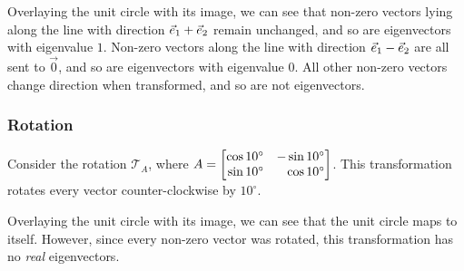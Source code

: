\begin{center}
\end{center}

Overlaying the unit circle with its image, we can see that non-zero vectors lying along the line with direction ${\vec e_1} + {\vec e_2}$ remain unchanged,
and so are eigenvectors
with eigenvalue $1$. Non-zero vectors along the line with direction ${\vec e_1} - {\vec e_2}$ are all sent to $\vec 0$, and so are eigenvectors with
eigenvalue $0$. All other non-zero vectors change direction when transformed, and so are not eigenvectors.

\begin{center}
\end{center}

\subsubsection*{Rotation}
Consider the rotation $\mathcal{T}_{A}$, where $A=\mat{\cos 10^{\circ} & -\sin 10^{\circ}\\ \sin 10^{\circ} & \cos 10^{\circ}}$. This transformation rotates every
vector counter-clockwise by $10^{\circ}$.

\begin{center}
\end{center}

Overlaying the unit circle with its image, we can see that the unit circle maps to itself. However, since every non-zero vector was rotated, this
transformation has no \emph{real} eigenvectors.

\begin{center}
\end{center}



